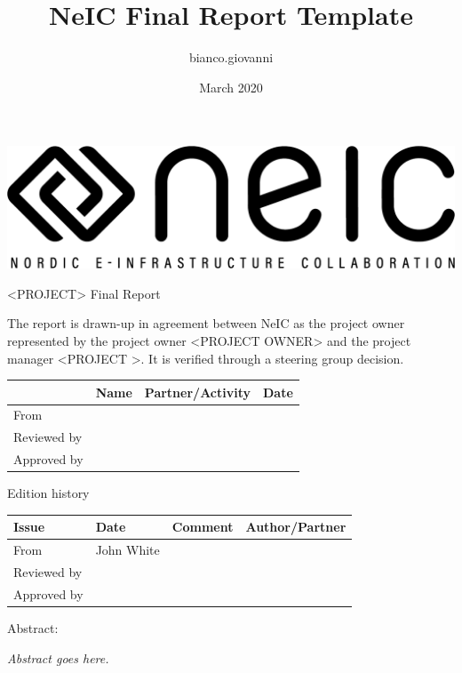 \documentclass{article}
\title{NeIC Final Report Template}
\author{bianco.giovanni }
\date{March 2020}
\begin{document}
\begin{center}
\includegraphics[width=\textwidth]{neic_logo_large.png}
\end{center}

\vspace{0.5in}
{\Huge <PROJECT> Final Report} \hline
\vspace{0.5in}

\noindent
{\large
{The report is drawn-up in agreement between NeIC as the project owner represented by the project owner <PROJECT OWNER> and the project manager <PROJECT >. It is verified through a steering group decision.
}
}

\begin{center}
\begin{tabular}{|l| l| l| l|} \hline

& Name
& Partner/Activity
& Date \\ \hline
From & 
 &
& 
\\ \hline
Reviewed by &
& 
& 
\\ \hline
Approved by &
& 
& 
\\ \hline
\end{tabular}
\end{center}

Edition history

\begin{center}
\begin{tabular}{|l| l| l| l|} \hline
Issue
& Date
& Comment
& Author/Partner \\ \hline
From & 
John White &
& 
\\ \hline
Reviewed by &
& 
& 
\\ \hline
Approved by &
& 
& 
\\ \hline
\end{tabular}
\end{center}

Abstract:

{\it Abstract goes here.}
\end{document}
